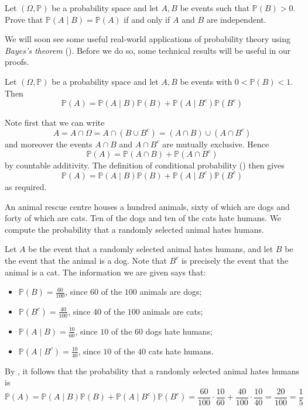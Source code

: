 \begin{exercise}
Let $(\Omega,\mathbb{P})$ be a probability space and let $A,B$ be events such that $\mathbb{P}(B)>0$. Prove that $\mathbb{P}(A \mid B) = \mathbb{P}(A)$ if and only if $A$ and $B$ are independent.
\end{exercise}

We will soon see some useful real-world applications of probability theory using \textit{Bayes's theorem} (). Before we do so, some technical results will be useful in our proofs.

\begin{proposition}
\label{propConditionalProbabilityPartition}
Let $(\Omega,\mathbb{P})$ be a probability space and let $A,B$ be events with $0<\mathbb{P}(B)<1$. Then
\[ \mathbb{P}(A) = \mathbb{P}(A \mid B)\mathbb{P}(B) + \mathbb{P}(A \mid B^c)\mathbb{P}(B^c) \]
\end{proposition}

\begin{cproof}
Note first that we can write
\[ A = A \cap \Omega = A \cap (B \cup B^c) = (A \cap B) \cup (A \cap B^c) \]
and moreover the events $A \cap B$ and $A \cap B^c$ are mutually exclusive. Hence
\[ \mathbb{P}(A) = \mathbb{P}(A \cap B) + \mathbb{P}(A \cap B^c) \]
by countable additivity. The definition of conditional probability () then gives
\[ \mathbb{P}(A) = \mathbb{P}(A \mid B)\mathbb{P}(B) + \mathbb{P}(A \mid B^c)\mathbb{P}(B^c) \]
as required.
\end{cproof}

\begin{example}
\label{exAnimalRescueCatsDogs}
An animal rescue centre houses a hundred animals, sixty of which are dogs and forty of which are cats. Ten of the dogs and ten of the cats hate humans. We compute the probability that a randomly selected animal hates humans.

Let $A$ be the event that a randomly selected animal hates humans, and let $B$ be the event that the animal is a dog. Note that $B^c$ is precisely the event that the animal is a cat. The information we are given says that:
\begin{itemize}
\item $\mathbb{P}(B) = \frac{60}{100}$, since $60$ of the $100$ animals are dogs;
\item $\mathbb{P}(B^c) = \frac{40}{100}$, since $40$ of the $100$ animals are cats;
\item $\mathbb{P}(A \mid B) = \frac{10}{60}$, since $10$ of the $60$ dogs hate humans;
\item $\mathbb{P}(A \mid B^c) = \frac{10}{40}$, since $10$ of the $40$ cats hate humans.
\end{itemize}
By , it follows that the probability that a randomly selected animal hates humans is
\[ \mathbb{P}(A) = \mathbb{P}(A \mid B) \mathbb{P}(B) + \mathbb{P}(A \mid B^c) \mathbb{P}(B^c) = \frac{60}{100} \cdot \frac{10}{60} + \frac{40}{100} \cdot \frac{10}{40} = \frac{20}{100} = \frac{1}{5} \]
\end{example}

